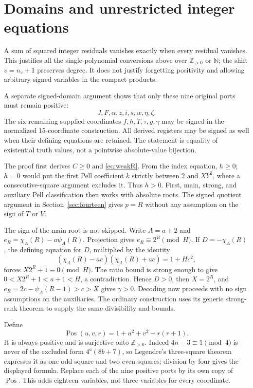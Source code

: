 \documentclass[11pt]{article}
\newcommand{\N}{\mathbb N}
\newcommand{\Pos}{\mathbb Z_{>0}}
\newcommand{\PP}{\operatorname{Pos}}
\begin{document}
\section{Domains and unrestricted integer equations}\label{sec:integers}

A sum of squared integer residuals vanishes exactly when every residual vanishes. This justifies all the single-polynomial conversions above over $\Pos$ or $\N$; the shift $v=n_v+1$ preserves degree. It does not justify forgetting positivity and allowing arbitrary signed variables in the compact products.

A separate signed-domain argument shows that only these nine original ports must remain positive:
\[
J,F,\alpha,z,i,s,w,\eta,\zeta.
\]
The six remaining supplied coordinates $f,h,T,\tau,y,\gamma$ may be signed in the normalized 15-coordinate construction. All derived registers may be signed as well when their defining equations are retained. The statement is equality of existential truth values, not a pointwise absolute-value bijection.

The proof first derives $C\geq0$ and \eqref{eq:weakR}. From the index equation, $h\geq0$; $h=0$ would put the first Pell coefficient $k$ strictly between 2 and $XY^2$, where a consecutive-square argument excludes it. Thus $h>0$. First, main, strong, and auxiliary Pell classification then works with absolute roots. The signed quotient argument in Section~\ref{sec:fourteen} gives $p=R$ without any assumption on the sign of $T$ or $V$.

The sign of the main root is not skipped. Write $A=a+2$ and
$e_R=\chi_A(R)-a\psi_A(R)$. Projection gives $e_R\equiv2^R\pmod H$.
If $D=-\chi_A(R)$, the defining equation for $D$, multiplied by the identity
\[
(\chi_A(R)-ac)(\chi_A(R)+ac)=1+Hc^2,
\]
forces $X2^R+1\equiv0\pmod H$. The ratio bound is strong enough to give
$0<X2^R+1<a+1<H$, a contradiction. Hence $D>0$, then $X=2^R$, and
$e_R=2c-\psi_A(R-1)>c>X$ gives $\gamma>0$. Decoding now proceeds with no sign assumptions on the auxiliaries. The ordinary construction uses its generic strong-rank theorem to supply the same divisibility and bounds.

Define
\[
\PP(u,v,r)=1+u^2+v^2+r(r+1).
\]
It is always positive and is surjective onto $\Pos$. Indeed $4n-3\equiv1\pmod4$ is never of the excluded form $4^a(8b+7)$, so Legendre's three-square theorem expresses it as one odd square and two even squares; division by four gives the displayed formula. Replace each of the nine positive ports by its own copy of $\PP$. This adds eighteen variables, not three variables for every coordinate.
\end{document}
